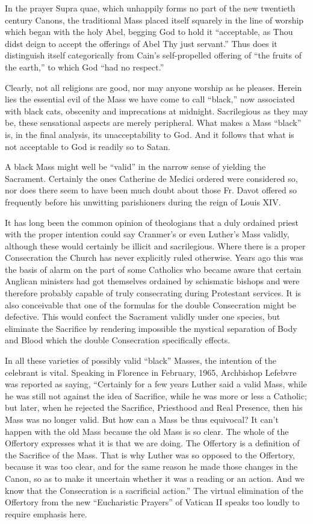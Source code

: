 In the prayer Supra quae, which unhappily forms no part of the new twentieth century Canons, the traditional Mass placed itself squarely in the line of worship which began with the holy Abel, begging God to hold it ``acceptable, as Thou didst deign to accept the offerings of Abel Thy just servant.'' Thus does it distinguish itself categorically from Cain's self-propelled offering of ``the fruits of the earth,'' to which God ``had no respect.''

Clearly, not all religions are good, nor may anyone worship as he pleases. Herein lies the essential evil of the Mass we have come to call ``black,'' now associated with black cats, obscenity and imprecations at midnight. Sacrilegious as they may be, these sensational aspects are merely peripheral. What makes a Mass ``black'' is, in the final analysis, its unacceptability to God. And it follows that what is not acceptable to God is readily so to Satan.

A black Mass might well be ``valid'' in the narrow sense of yielding the Sacrament. Certainly the ones Catherine de Medici ordered were considered so, nor does there seem to have been much doubt about those Fr. Davot offered so frequently before his unwitting parishioners during the reign of Louis XIV.

It has long been the common opinion of theologians that a duly ordained priest with the proper intention could say Cranmer's or even Luther's Mass validly, although these would certainly be illicit and sacrilegious. Where there is a proper Consecration the Church has never explicitly ruled otherwise. Years ago this was the basis of alarm on the part of some Catholics who became aware that certain Anglican ministers had got themselves ordained by schismatic bishops and were therefore probably capable of truly consecrating during Protestant services. It is also conceivable that one of the formulas for the double Consecration might be defective. This would confect the Sacrament validly under one species, but eliminate the Sacrifice by rendering impossible the mystical separation of Body and Blood which the double Consecration specifically effects.

In all these varieties of possibly valid ``black'' Masses, the intention of the celebrant is vital. Speaking in Florence in February, 1965, Archbishop Lefebvre was reported as saying, ``Certainly for a few years Luther said a valid Mass, while he was still not against the idea of Sacrifice, while he was more or less a Catholic; but later, when he rejected the Sacrifice, Priesthood and Real Presence, then his Mass was no longer valid. But how can a Mass be thus equivocal? It can't happen with the old Mass because the old Mass is so clear. The whole of the Offertory expresses what it is that we are doing. The Offertory is a definition of the Sacrifice of the Mass. That is why Luther was so opposed to the Offertory, because it was too clear, and for the same reason he made those changes in the Canon, so as to make it uncertain whether it was a reading or an action. And we know that the Consecration is a sacrificial action.'' The virtual elimination of the Offertory from the new ``Eucharistic Prayers'' of Vatican II speaks too loudly to require emphasis here.

